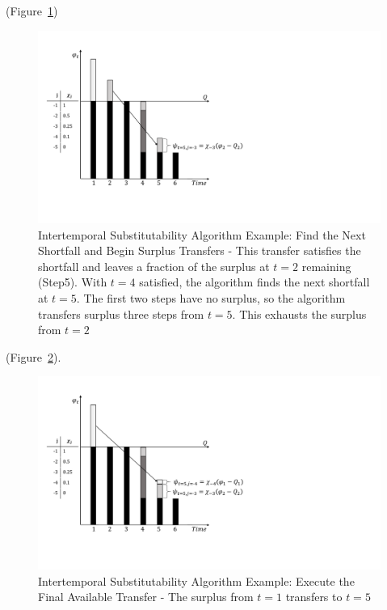 \documentclass[preprint,12pt]{elsarticle}
\begin{document}
(Figure~\ref{f:Chi2-4})
\begin{figure}[h]
  \centering\includegraphics[width=\textwidth]{Chi2-4.pdf}
  \caption{Intertemporal Substitutability Algorithm Example: Find the
    Next Shortfall and Begin Surplus Transfers - This transfer
    satisfies the shortfall and leaves a fraction of the surplus at
    $t=2$ remaining (Step5). With $t=4$ satisfied, the algorithm finds
    the next shortfall at $t=5$. The first two steps have no surplus,
    so the algorithm transfers surplus three steps from $t=5$. This
    exhausts the surplus from $t=2$}
  \label{f:Chi2-4}
\end{figure}
(Figure~\ref{f:Chi2-5}). 
\begin{figure}[h]
  \centering\includegraphics[width=\textwidth]{Chi2-5.pdf}
  \caption{Intertemporal Substitutability Algorithm Example: Execute
    the Final Available Transfer - The surplus from $t=1$ transfers to
    $t=5$}
  \label{f:Chi2-5}
\end{figure}
\end{document}
